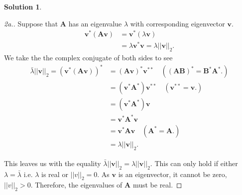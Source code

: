 \documentclass[12pt]{article}
\newcommand{\norm}[1]{ \left|\left| #1 \right|\right| }
\renewcommand{\vec}[1]{\mathbf{#1}}
\theoremstyle{definition}
\newtheorem{sol}{Solution}
\theoremstyle{remark}
\begin{document}
\begin{sol}\leavevmode
    \begin{proof}[2a.]
        Suppose that $\vec{A}$ has an eigenvalue $\lambda$ with corresponding eigenvector $\vec{v}$.
        \begin{align}
            \vec{v}^*(\vec{Av}) &= \vec{v}^*(\lambda \vec{v})\\
                                &= \lambda \vec{v}^*\vec{v} = \lambda \norm{\vec{v}}_2.
        \end{align}
We take the the complex conjugate of both sides to see
\begin{align}
    \bar{\lambda} \norm{\vec{v}}_2 = (\vec{v}^*(\vec{Av}))^* &= (\vec{Av})^*\vec{v}^{**} \quad ((\vec{AB})^* = \vec{B}^*\vec{A}^*.) \\
                            &= (\vec{v}^* \vec{A}^*)\vec{v}^{**} \quad (\vec{v}^{**} = \vec{v}.)\\
                            &= (\vec{v}^* \vec{A}^*)\vec{v} \\
                            &= \vec{v}^*\vec{A}^*\vec{v} \\
                            &= \vec{v}^* \vec{A}\vec{v} \quad ( \vec{A}^* = \vec{A}. )\\
                            &= \lambda \norm{\vec{v}}_2.
\end{align}

This leaves us with the equality $\bar{\lambda}\norm{\vec{v}}_2 = \lambda \norm{\vec{v}}_2$. This can only hold if either $\lambda = \bar{\lambda}$ i.e. $\lambda$ is real or $\norm{v}_2 = 0$. As $\vec{v}$ is an eigenvector, it cannot be zero, $\norm{v}_2 > 0$. Therefore, the eigenvalues of $\vec{A}$ must be real.
    \end{proof}


\end{sol}
\end{document}
